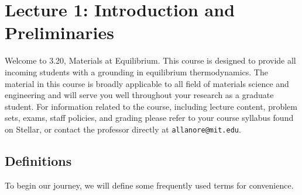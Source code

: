 \documentclass[12pt]{article}
\begin{document}

\section{Lecture 1: Introduction and Preliminaries}
Welcome to 3.20, Materials at Equilibrium.  This course is designed to provide all incoming students with a grounding in equilibrium thermodynamics.  The material in this course is broadly applicable to all field of materials science and engineering and will serve you well throughout your research as a graduate student.  For information related to the course, including lecture content, problem sets, exams, staff policies, and grading please refer to your course syllabus found on Stellar, or contact the professor directly at \texttt{allanore@mit.edu}.

\subsection{Definitions}
To begin our journey, we will define some frequently used terms for convenience.
\end{document}
